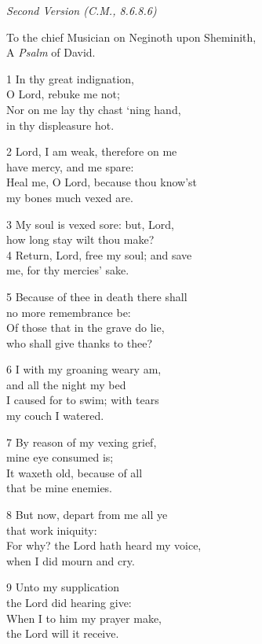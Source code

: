 \begin{multicols}{3}
\begin{center}
\quad{}\quad{}
\end{center}

\emph{Second Version (C.M., 8.6.8.6)}

To the chief Musician on Neginoth upon Sheminith,\\
A \emph{Psalm} of David.

1 In thy great indignation,\\
O Lord, rebuke me not;\\
Nor on me lay thy chast ‘ning hand,\\
in thy displeasure hot.

2 Lord, I am weak, therefore on me\\
have mercy, and me spare:\\
Heal me, O Lord, because thou know’st\\
my bones much vexed are.

3 My soul is vexed sore: but, Lord,\\
how long stay wilt thou make?\\
4 Return, Lord, free my soul; and save\\
me, for thy mercies’ sake.

5 Because of thee in death there shall\\
no more remembrance be:\\
Of those that in the grave do lie,\\
who shall give thanks to thee?

6 I with my groaning weary am,\\
and all the night my bed\\
I caused for to swim; with tears\\
my couch I watered.

7 By reason of my vexing grief,\\
mine eye consumed is;\\
It waxeth old, because of all\\
that be mine enemies.

8 But now, depart from me all ye\\
that work iniquity:\\
For why? the Lord hath heard my voice,\\
when I did mourn and cry.

9 Unto my supplication\\
the Lord did hearing give:\\
When I to him my prayer make,\\
the Lord will it receive.


\end{multicols}
